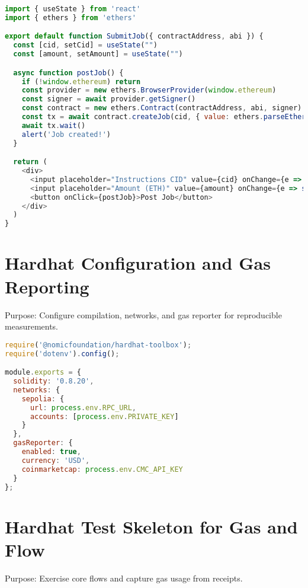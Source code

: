 \begin{lstlisting}[language=JavaScript,caption={SubmitJob.jsx}]
import { useState } from 'react'
import { ethers } from 'ethers'

export default function SubmitJob({ contractAddress, abi }) {
  const [cid, setCid] = useState("")
  const [amount, setAmount] = useState("")

  async function postJob() {
    if (!window.ethereum) return
    const provider = new ethers.BrowserProvider(window.ethereum)
    const signer = await provider.getSigner()
    const contract = new ethers.Contract(contractAddress, abi, signer)
    const tx = await contract.createJob(cid, { value: ethers.parseEther(amount) })
    await tx.wait()
    alert('Job created!')
  }

  return (
    <div>
      <input placeholder="Instructions CID" value={cid} onChange={e => setCid(e.target.value)} />
      <input placeholder="Amount (ETH)" value={amount} onChange={e => setAmount(e.target.value)} />
      <button onClick={postJob}>Post Job</button>
    </div>
  )
}
\end{lstlisting}

\section{Hardhat Configuration and Gas Reporting}
\noindent Purpose: Configure compilation, networks, and gas reporter for reproducible measurements.

\begin{lstlisting}[language=JavaScript,caption={hardhat.config.js}]
require('@nomicfoundation/hardhat-toolbox');
require('dotenv').config();

module.exports = {
  solidity: '0.8.20',
  networks: {
    sepolia: {
      url: process.env.RPC_URL,
      accounts: [process.env.PRIVATE_KEY]
    }
  },
  gasReporter: {
    enabled: true,
    currency: 'USD',
    coinmarketcap: process.env.CMC_API_KEY
  }
};
\end{lstlisting}

\section{Hardhat Test Skeleton for Gas and Flow}
\noindent Purpose: Exercise core flows and capture gas usage from receipts.

